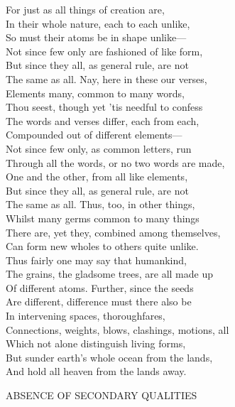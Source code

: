 For just as all things of creation are,\\
In their whole nature, each to each unlike,\\
So must their atoms be in shape unlike—\\
Not since few only are fashioned of like form,\\
But since they all, as general rule, are not\\
The same as all. Nay, here in these our verses,\\
Elements many, common to many words,\\
Thou seest, though yet 'tis needful to confess\\
The words and verses differ, each from each,\\
Compounded out of different elements—\\
Not since few only, as common letters, run\\
Through all the words, or no two words are made,\\
One and the other, from all like elements,\\
But since they all, as general rule, are not\\
The same as all. Thus, too, in other things,\\
Whilst many germs common to many things\\
There are, yet they, combined among themselves,\\
Can form new wholes to others quite unlike.\\
Thus fairly one may say that humankind,\\
The grains, the gladsome trees, are all made up\\
Of different atoms. Further, since the seeds\\
Are different, difference must there also be\\
In intervening spaces, thoroughfares,\\
Connections, weights, blows, clashings, motions, all\\
Which not alone distinguish living forms,\\
But sunder earth's whole ocean from the lands,\\
And hold all heaven from the lands away.

ABSENCE OF SECONDARY QUALITIES


